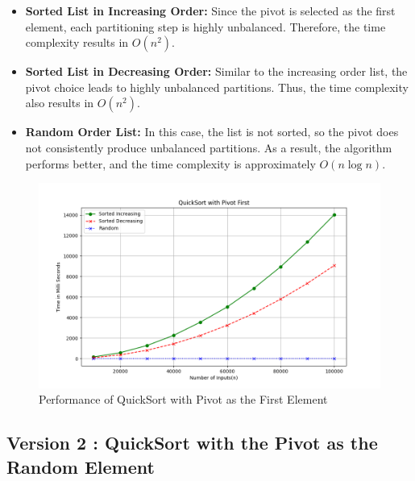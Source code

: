 \documentclass[a4paper,12pt]{report}
\begin{document}
\begin{itemize}
    \item \textbf{Sorted List in Increasing Order:} Since the pivot is selected as the first element, each partitioning step is highly unbalanced. Therefore, the time complexity results in \(O(n^2)\).
    
    \item \textbf{Sorted List in Decreasing Order:} Similar to the increasing order list, the pivot choice leads to highly unbalanced partitions. Thus, the time complexity also results in \(O(n^2)\).
    
    \item \textbf{Random Order List:} In this case, the list is not sorted, so the pivot does not consistently produce unbalanced partitions. As a result, the algorithm performs better, and the time complexity is approximately \(O(n \log n)\).
\end{itemize}
\begin{figure}[H]
    \centering
    \includegraphics[width=1.1\textwidth]{./QuickSortPivotFirst.png}
    \caption{Performance of QuickSort with Pivot as the First Element}
    \label{fig:quicksort_performance}
\end{figure}

\subsection{Version 2 : QuickSort with the Pivot as the Random Element} 
\end{document}
